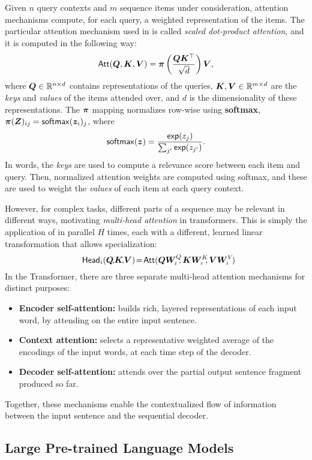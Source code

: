 Given $n$ query contexts and $m$ sequence items under consideration,
attention mechanisms compute, for each query, a weighted
representation of the items. The particular attention mechanism used
in \citet{vaswani2017attention} is called \emph{scaled dot-product
    attention}, and it is computed in the following way:
%
\begin{equation}
    \operatorname{\mathsf{Att}}(\bm{Q}, \bm{K}, \bm{V}) = \bm{\pi}
    \left(\frac{\bm{Q}\bm{K}^\top}{\sqrt{d}}\right) \bm{V},
    \label{eq:att_scaled_dot}
\end{equation}
%
where $\bm{Q} \in \mathbb{R}^{n \times d}$ contains representations of the
queries, $\bm{K}, \bm{V} \in \mathbb{R}^{m \times d}$
are the \emph{keys} and \emph{values} of the items attended over,
and $d$ is the dimensionality of these
representations.
The $\bm{\pi}$ mapping normalizes row-wise using \textbf{softmax},
$\bm{\pi}(\bm{Z})_{ij} = \operatorname*{\mathsf{softmax}}(\bm{z}_i)_j$, where
%
\begin{equation}\label{eq:softmax}
    \operatorname*{\mathsf{softmax}}(\bm{z}) = \frac{\operatorname*{\mathsf{exp}}(z_j)}{\sum_{j'} \operatorname*{\mathsf{exp}}(z_{j'})}.
\end{equation}
%
In words, the \emph{keys} are used to compute a relevance score
between each item and query. Then, normalized attention weights are computed
using softmax, and these are used to weight the \emph{values} of each item at each
query context.

However, for complex tasks, different parts of a sequence may be relevant in
different ways, motivating \emph{multi-head attention} in transformers.
This is simply the application of
 in parallel $H$ times, each with a different,
learned linear transformation that allows specialization:
%
\begin{equation}\label{eq:head}%
    \hspace{-.01ex}%
    \ath_i(\bm{Q}\!,\!\bm{K}\!,\!\bm{V})\!=\!\att(\bm{QW}_i^Q\!\!,\bm{KW}_i^K\!\!,\bm{VW}_i^V\!)%
    \hspace{-1.5ex}%
\end{equation}
%
In the Transformer, there are three separate multi-head attention mechanisms for
distinct purposes:
\begin{itemize}
    \item \textbf{Encoder self-attention:} builds rich, layered representations of
          each input word, by attending on the entire input sentence.
    \item \textbf{Context attention:} selects
          a representative weighted average of the encodings of the input words, at each
          time step of the decoder.
    \item \textbf{Decoder self-attention:} attends over the partial output sentence
          fragment produced so far.
\end{itemize}
Together, these mechanisms enable the contextualized flow of information between
the input sentence and the sequential decoder.

\subsection{Large Pre-trained Language Models}
